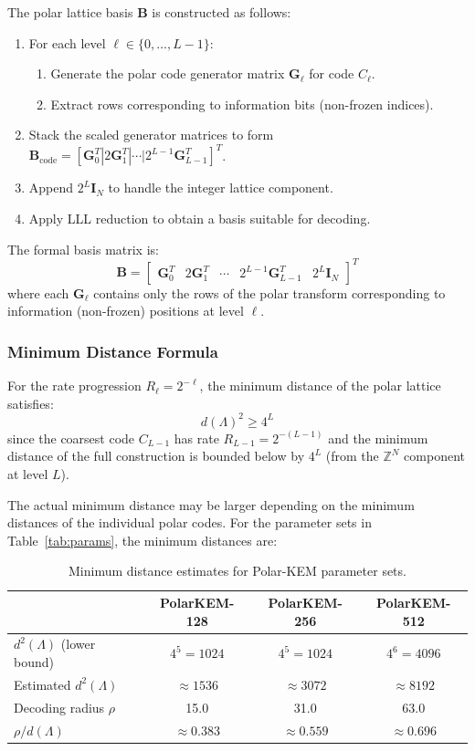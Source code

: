 \documentclass[11pt,a4paper]{article}
\newcommand{\polarKem}{\textsf{Polar-KEM}\xspace}
\newcommand{\Z}{\mathbb{Z}}
\begin{document}
The polar lattice basis $\mathbf{B}$ is constructed as follows:

\begin{enumerate}[leftmargin=2em]
\item For each level $\ell \in \{0, \ldots, L-1\}$:
  \begin{enumerate}
  \item Generate the polar code generator matrix $\mathbf{G}_\ell$ for code $C_\ell$.
  \item Extract rows corresponding to information bits (non-frozen indices).
  \end{enumerate}
\item Stack the scaled generator matrices to form $\mathbf{B}_{\text{code}} = [\mathbf{G}_0^T | 2\mathbf{G}_1^T | \cdots | 2^{L-1}\mathbf{G}_{L-1}^T]^T$.
\item Append $2^L \mathbf{I}_N$ to handle the integer lattice component.
\item Apply LLL reduction to obtain a basis suitable for decoding.
\end{enumerate}

The formal basis matrix is:
\[
\mathbf{B} = \begin{bmatrix}
\mathbf{G}_0^T & 2\mathbf{G}_1^T & \cdots & 2^{L-1}\mathbf{G}_{L-1}^T & 2^L \mathbf{I}_N
\end{bmatrix}^T
\]
where each $\mathbf{G}_\ell$ contains only the rows of the polar transform corresponding to information (non-frozen) positions at level $\ell$.

\subsubsection{Minimum Distance Formula}

For the rate progression $R_\ell = 2^{-\ell}$, the minimum distance of the polar lattice satisfies:
\[
d(\Lambda)^2 \geq 4^L
\]
since the coarsest code $C_{L-1}$ has rate $R_{L-1} = 2^{-(L-1)}$ and the minimum distance of the full construction is bounded below by $4^L$ (from the $\Z^N$ component at level $L$).

The actual minimum distance may be larger depending on the minimum distances of the individual polar codes. For the parameter sets in Table~\ref{tab:params}, the minimum distances are:

\begin{table}[H]
\centering
\caption{Minimum distance estimates for \polarKem parameter sets.}
\label{tab:min-dist}
\begin{tabular}{@{}lccc@{}}
\toprule
 & \textbf{PolarKEM-128} & \textbf{PolarKEM-256} & \textbf{PolarKEM-512} \\
\midrule
$d^2(\Lambda)$ (lower bound) & $4^5 = 1024$ & $4^5 = 1024$ & $4^6 = 4096$ \\
Estimated $d^2(\Lambda)$ & $\approx 1536$ & $\approx 3072$ & $\approx 8192$ \\
Decoding radius $\rho$ & 15.0 & 31.0 & 63.0 \\
$\rho / d(\Lambda)$ & $\approx 0.383$ & $\approx 0.559$ & $\approx 0.696$ \\
\bottomrule
\end{tabular}
\end{table}
\end{document}

